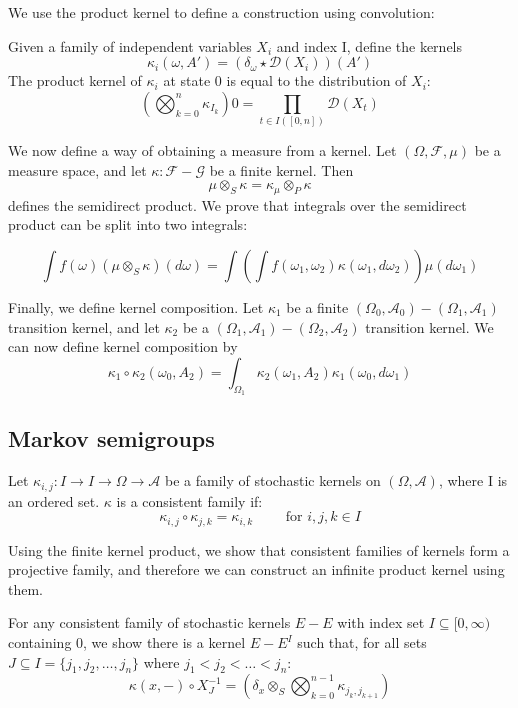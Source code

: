 \documentclass[orivec, envcountsame]{llncs}
\begin{document}
We use the product kernel to define a construction using convolution:
\begin{lemma}\label{lemma:convolution}
Given a family of independent variables \(X_i\) and index I, define the kernels \[\kappa_i(\omega, A') = (\delta_\omega \star \mathcal{D}(X_i))(A')\] The product kernel of \(\kappa_i\) at state 0 is equal to the distribution of \(X_i\):
\[\left(\bigotimes_{k=0}^n \kappa_{I_k}\right) 0 = \prod_{t\in I([0,n])}\mathcal{D}(X_t)\]
\end{lemma}

We now define a way of obtaining a measure from a kernel. Let \((\Omega, \mathcal{F}, \mu)\) be a measure space, and let \(\kappa: \mathcal{F} - \mathcal{G}\) be a finite kernel. Then
\[\mu \otimes_S \kappa = \kappa_\mu \otimes_P \kappa\]
defines the semidirect product. We prove that integrals over the semidirect product can be split into two integrals:

\[\int f(\omega) (\mu \otimes_S \kappa)(d \omega) = \int \left(\int f(\omega_1, \omega_2) \kappa(\omega_1, d\omega_2)\right) \mu(d\omega_1)\]

Finally, we define kernel composition. Let \(\kappa_1\) be a finite \((\Omega_0, \mathcal{A}_0) - (\Omega_1, \mathcal{A}_1)\) transition kernel, and let \(\kappa_2\) be a \((\Omega_1, \mathcal{A}_1) - (\Omega_2, \mathcal{A}_2)\) transition kernel. We can now define kernel composition by \[\kappa_1 \circ \kappa_2(\omega_0, A_2) = \int_{\Omega_1} \kappa_2(\omega_1, A_2) \kappa_1(\omega_0, d\omega_1) \]

\subsection{Markov semigroups}
Let \(\kappa_{i,j} :I \to I \to \Omega \to \mathcal{A}\) be a family of stochastic kernels on \((\Omega, \mathcal{A})\), where I is an ordered set. \(\kappa\) is a consistent family if:
\[\kappa_{i,j} \circ \kappa_{j,k} = \kappa_{i,k} \qquad \text{ for } i,j,k \in I\]

Using the finite kernel product, we show that consistent families of kernels form a projective family, and therefore we can construct an infinite product kernel using them.

\begin{lemma}
For any consistent family of stochastic kernels \(E - E\) with index set \(I \subseteq [0, \infty)\) containing 0, we show there is a kernel \(E - E^I\) such that, for all sets \(J \subseteq I = \{j_1, j_2, \dots, j_n\}\) where \(j_1 < j_2 < \dots < j_n\): 
    \[\kappa(x, -) \circ X_J^{-1} = \left(\delta_x \otimes_S \bigotimes_{k=0}^{n-1} \kappa_{j_k, j_{k+1}}\right)\]
\end{lemma}
\end{document}
